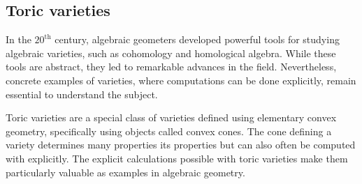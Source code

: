 \documentclass[12pt]{amsart}
\theoremstyle{plain}
\begin{document}
%

\newpage
\subsection*{Toric varieties}
In the $20^\text{th}$ century, algebraic geometers developed powerful tools for studying algebraic varieties, such as cohomology and homological algebra.
While these tools are abstract, they led to remarkable advances in the field.
Nevertheless, concrete examples of varieties, where computations can be done explicitly, remain essential to understand the subject.

Toric varieties are a special class of varieties defined using elementary convex geometry, specifically using objects called convex cones.
The cone defining a variety determines many properties its properties but can also often be computed with explicitly.
The explicit calculations possible with toric varieties make them particularly valuable as examples in algebraic geometry.
\end{document}

